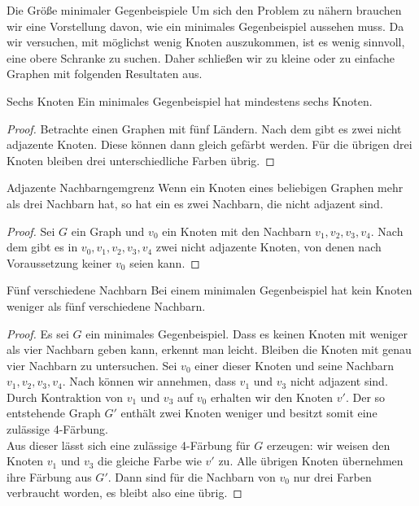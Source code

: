 \begin{section}{Die Größe minimaler Gegenbeispiele}
 Um sich den Problem zu nähern brauchen wir eine Vorstellung davon, wie ein minimales Gegenbeispiel aussehen muss. Da wir versuchen, mit möglichst wenig Knoten auszukommen, ist es wenig sinnvoll, eine obere Schranke zu suchen. Daher schließen wir zu kleine oder zu einfache Graphen mit folgenden Resultaten aus.
 
 \begin{proposition}{Sechs Knoten}
  Ein minimales Gegenbeispiel hat mindestens sechs Knoten.
 \end{proposition}
 \begin{proof}
  Betrachte einen Graphen mit fünf Ländern. Nach dem  gibt es zwei nicht adjazente Knoten. Diese können dann gleich gefärbt werden. Für die übrigen drei Knoten bleiben drei unterschiedliche Farben übrig.
 \end{proof}
 
 \begin{propositionl}{Adjazente Nachbarn}{gemgrenz}
  Wenn ein Knoten eines beliebigen Graphen mehr als drei Nachbarn hat, so hat ein es zwei Nachbarn, die nicht adjazent sind.
 \end{propositionl}
 \begin{proof}
  Sei $G$ ein Graph und $v_0$ ein Knoten mit den Nachbarn $v_1,v_2,v_3,v_4$. Nach dem  gibt es in $v_0,v_1,v_2,v_3,v_4$ zwei nicht adjazente Knoten, von denen nach Voraussetzung keiner $v_0$ seien kann.
 \end{proof}
 
 \begin{satz}{Fünf verschiedene Nachbarn}
  Bei einem minimalen Gegenbeispiel hat kein Knoten weniger als fünf verschiedene Nachbarn.
 \end{satz}
 \begin{proof}
  Es sei $G$ ein minimales Gegenbeispiel. Dass es keinen Knoten mit weniger als vier Nachbarn geben kann, erkennt man leicht. Bleiben die Knoten mit genau vier Nachbarn zu untersuchen. Sei $v_0$ einer dieser Knoten und seine Nachbarn $v_1,v_2,v_3,v_4$. Nach  können wir annehmen, dass $v_1$ und $v_3$ nicht adjazent sind. Durch Kontraktion von $v_1$ und $v_3$ auf $v_0$ erhalten wir den Knoten $v'$. Der so entstehende Graph $G'$ enthält zwei Knoten weniger und besitzt somit eine zulässige 4-Färbung.\\
  Aus dieser lässt sich eine zulässige 4-Färbung für $G$ erzeugen: wir weisen den Knoten $v_1$ und $v_3$ die gleiche Farbe wie $v'$ zu. Alle übrigen Knoten übernehmen ihre Färbung aus $G'$. Dann sind für die Nachbarn von $v_0$ nur drei Farben verbraucht worden, es bleibt also eine übrig.
 \end{proof}
\end{section}